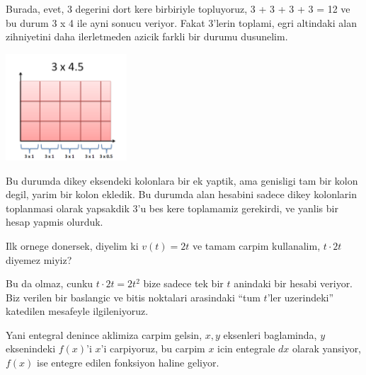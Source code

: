 \documentclass[12pt,fleqn]{article}
\begin{document}
Burada, evet, 3 degerini dort kere birbiriyle topluyoruz, 3 + 3 + 3 + 3 =
12 ve bu durum 3 x 4 ile ayni sonucu veriyor. Fakat 3'lerin toplami, egri
altindaki alan zihniyetini daha ilerletmeden azicik farkli bir durumu
dusunelim. 

\includegraphics[height=4cm]{piecewise-multiplication.png}

Bu durumda dikey eksendeki kolonlara bir ek yaptik, ama genisligi tam bir
kolon degil, yarim bir kolon ekledik. Bu durumda alan hesabini sadece dikey
kolonlarin toplanmasi olarak yapsakdik 3'u bes kere toplamamiz gerekirdi,
ve yanlis bir hesap yapmis olurduk.

Ilk ornege donersek, diyelim ki $v(t) = 2t$ ve tamam carpim kullanalim,
$t
\cdot 2t$ diyemez miyiz? 

Bu da olmaz, cunku $t\cdot 2t = 2t^2$ bize sadece tek bir $t$ anindaki bir
hesabi veriyor. Biz verilen bir baslangic ve bitis noktalari arasindaki
``tum $t$'ler uzerindeki'' katedilen mesafeyle ilgileniyoruz.  

Yani entegral denince aklimiza carpim gelsin, $x,y$ eksenleri baglaminda,
$y$ eksenindeki $f(x)$'i $x$'i carpiyoruz, bu carpim $x$ icin entegrale
$dx$ olarak yansiyor, $f(x)$ ise entegre edilen fonksiyon haline geliyor. 
\end{document}
